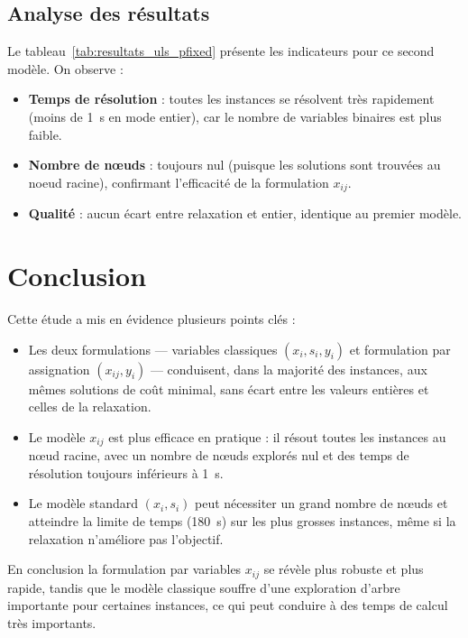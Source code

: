 \documentclass[a4paper,12pt]{article}
\theoremstyle{blueDefinition}
\theoremstyle{redProperty}
\begin{document}
\subsection*{Analyse des résultats}
Le tableau~\ref{tab:resultats_uls_pfixed} présente les indicateurs pour ce second modèle. On observe :
\begin{itemize}
\item \textbf{Temps de résolution} : toutes les instances se résolvent très rapidement (moins de 1~s en mode entier), car le nombre de variables binaires est plus faible.
\item \textbf{Nombre de nœuds} : toujours nul (puisque les solutions sont trouvées au noeud racine), confirmant l'efficacité de la formulation $x_{ij}$.
\item \textbf{Qualité} : aucun écart entre relaxation et entier, identique au premier modèle.
\end{itemize}

\section*{Conclusion}
Cette étude a mis en évidence plusieurs points clés :
\begin{itemize}
  \item Les deux formulations — variables classiques $(x_i,s_i,y_i)$ et formulation par assignation $(x_{ij},y_i)$ — conduisent, dans la majorité des instances, aux mêmes solutions de coût minimal, sans écart entre les valeurs entières et celles de la relaxation.
  \item Le modèle $x_{ij}$ est plus efficace en pratique : il résout toutes les instances au nœud racine, avec un nombre de nœuds explorés nul et des temps de résolution toujours inférieurs à 1~s.
  \item Le modèle standard $(x_i,s_i)$ peut nécessiter un grand nombre de nœuds et atteindre la limite de temps (180~s) sur les plus grosses instances, même si la relaxation n'améliore pas l'objectif.
\end{itemize}
En conclusion la formulation par variables $x_{ij}$ se révèle plus robuste et plus rapide, tandis que le modèle classique souffre d'une exploration d'arbre importante pour certaines instances, ce qui peut conduire à des temps de calcul très importants.
\end{document}
